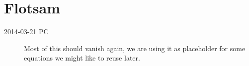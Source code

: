 
\chapter{Flotsam}
\label{chap:flotsam}
    \begin{description}
    \item[2014-03-21 PC] Most of this should vanish again, we are using
        it as placeholder for some equations we might like to reuse later.
    \end{description}



